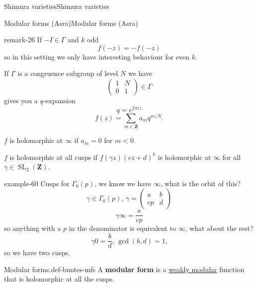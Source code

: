 \documentclass[10pt,]{book}
\newcommand{\terminology}[1]{\textbf{#1}}
\numberwithin{equation}{section}
\newcommand{\ZZ}{\mathbf{Z}}
\DeclareMathOperator{\SL}{SL}
\newcommand{\lt}{<}
\newcommand{\amp}{&}
\begin{document}
\begin{chapterptx}{Shimura varieties}{}{Shimura varieties}{}{}
\begin{sectionptx}{Modular forms (Asra)}{}{Modular forms (Asra)}{}{}
\begin{remark}{}{remark-26}%
\hypertarget{p-1054}{}%
If \(-I \in \Gamma\) and \(k\) odd%
\begin{equation*}
f(-z)  = - f(-z)
\end{equation*}
so in this setting we only have interesting behaviour for even \(k\).%
\par
\hypertarget{p-1055}{}%
If \(\Gamma\) is a congruence subgroup of level \(N\) we have%
\begin{equation*}
\begin{pmatrix} 1\amp N \\ 0 \amp 1 \end{pmatrix} \in \Gamma
\end{equation*}
gives you a \(q\)-expansion%
\begin{equation*}
q=  e^{2\pi i z}
\end{equation*}
%
\begin{equation*}
f(z) = \sum_{m\in \ZZ} a_m  q^{m/N}\text{.}
\end{equation*}
%
\par
\hypertarget{p-1056}{}%
\(f\) is holomorphic at \(\infty\) if \(a_m  = 0\) for \(m \lt 0\).%
\par
\hypertarget{p-1057}{}%
\(f\) is holomorphic at all cusps if \(f(\gamma z)(cz+d)^k\) is holomorphic at \(\infty\) for all \(\gamma \in \SL_2(\ZZ)\).%
\end{remark}
\begin{example}{}{example-60}%
\hypertarget{p-1058}{}%
Cusps for \(\Gamma_0(p)\), we know we have \(\infty\), what is the orbit of this?%
\begin{equation*}
\gamma\in \Gamma_0(p),\, \gamma  =  \begin{pmatrix} a\amp b \\ cp \amp d    \end{pmatrix}
\end{equation*}
%
\begin{equation*}
\gamma \infty  = \frac{a}{cp}
\end{equation*}
so anything with  a \(p\) in the denominator is equivalent to \(\infty\), what about the rest?%
\begin{equation*}
\gamma 0  = \frac{b}{d}, \, \gcd(b,d)  =1\text{,}
\end{equation*}
so we have two cusps.%
\end{example}
\begin{definition}{Modular forms.}{def-buntes-mfs}%
\hypertarget{p-1059}{}%
A \terminology{modular form} is  a \hyperref[def-buntes-weak-modular]{weakly modular} function that is holomorphic at all the cusps.%

\end{definition}
\end{sectionptx}
\end{chapterptx}
\end{document}
